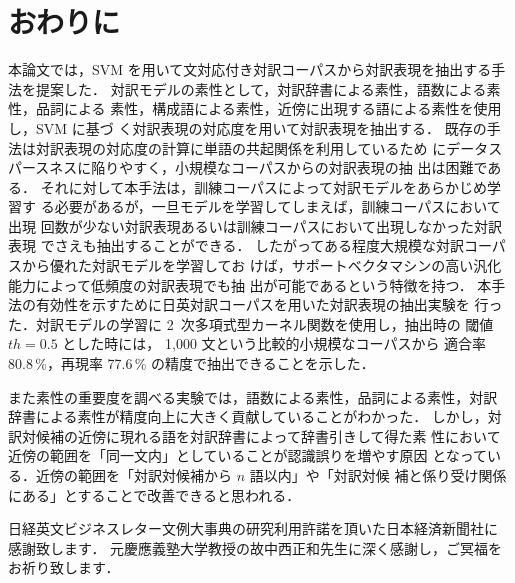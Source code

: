 \section{おわりに}
\label{sec:conclusion}

本論文では，SVM を用いて文対応付き対訳コーパスから対訳表現を抽出する手
法を提案した．
対訳モデルの素性として，対訳辞書による素性，語数による素性，品詞による
素性，構成語による素性，近傍に出現する語による素性を使用し，SVM に基づ
く対訳表現の対応度を用いて対訳表現を抽出する．
既存の手法は対訳表現の対応度の計算に単語の共起関係を利用しているため
にデータスパースネスに陥りやすく，小規模なコーパスからの対訳表現の抽
出は困難である．
それに対して本手法は，訓練コーパスによって対訳モデルをあらかじめ学習す
る必要があるが，一旦モデルを学習してしまえば，訓練コーパスにおいて出現
回数が少ない対訳表現あるいは訓練コーパスにおいて出現しなかった対訳表現
でさえも抽出することができる．
したがってある程度大規模な対訳コーパスから優れた対訳モデルを学習してお
けば，サポートベクタマシンの高い汎化能力によって低頻度の対訳表現でも抽
出が可能であるという特徴を持つ．
本手法の有効性を示すために日英対訳コーパスを用いた対訳表現の抽出実験を
行った．対訳モデルの学習に 2~次多項式型カーネル関数を使用し，抽出時の
閾値 $th=0.5$ とした時には， 1,000 文という比較的小規模なコーパスから
適合率 80.8\,\%，再現率 77.6\,\% の精度で抽出できることを示した．

また素性の重要度を調べる実験では，語数による素性，品詞による素性，対訳
辞書による素性が精度向上に大きく貢献していることがわかった．
しかし，対訳対候補の近傍に現れる語を対訳辞書によって辞書引きして得た素
性において近傍の範囲を「同一文内」としていることが認識誤りを増やす原因
となっている．近傍の範囲を「対訳対候補から $n$ 語以内」や「対訳対候
補と係り受け関係にある」とすることで改善できると思われる．


\acknowledgment

日経英文ビジネスレター文例大事典の研究利用許諾を頂いた日本経済新聞社に
感謝致します．
元慶應義塾大学教授の故中西正和先生に深く感謝し，ご冥福をお祈り致します．





\nocite{satoken_coling2002}
\nocite{satoken_sci2002}

\begin{biography}


\end{biography}




